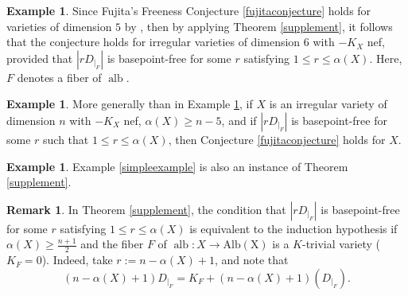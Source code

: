 \documentclass[sn-mathphys-num]{sn-jnl}%
\theoremstyle{definition}
\newtheorem{remark}[theorem]{Remark}
\newtheorem{example}[theorem]{Example}
\numberwithin{equation}{section}
\begin{document}
\begin{example}\label{6dimensionexample}
    Since Fujita's Freeness Conjecture \ref{fujitaconjecture} holds for varieties of dimension $5$ by \cite{feizhu}, then by applying Theorem \ref{supplement}, it follows that the conjecture holds for irregular varieties of dimension $6$ with $-K_{X}$ nef, provided that  $|rD_{|_{F}}|$ is basepoint-free for some $r$ satisfying  $1\leq r  \leq \alpha(X)$. Here, $F$ denotes a fiber of $\operatorname{alb}$.
\end{example}
\begin{example}
    More generally than in Example \ref{6dimensionexample}, if $X$ is an irregular variety of dimension $n$ with  $-K_{X}$ nef, $\alpha(X) \geq n-5$, and if $|rD_{|_{F}}|$ is basepoint-free for some $r$ such that  $1\leq r  \leq \alpha(X)$, then Conjecture \ref{fujitaconjecture} holds for $X$.
\end{example}
\begin{example}
Example \ref{simpleexample} is also an instance of Theorem \ref{supplement}. 
\end{example}
\begin{remark}
In Theorem \ref{supplement}, the condition that $|rD_{|_{F}}|$ is basepoint-free for some $r$ satisfying  $1\leq r  \leq \alpha(X)$ is equivalent  to the induction hypothesis if $\alpha(X) \geq \frac{n+1}{2}$ and the fiber $F$ of $\operatorname{alb}: X \to \operatorname{Alb(X)}$ is a $K$-trivial variety ($K_{F}=0$). Indeed, take $r := n- \alpha(X) +1$, and  note that $$(n -\alpha(X)+1)D_{|_{F}} = K_{F} + (n-\alpha(X)+1)(D_{|_{F}}) \text{.}$$
\end{remark}
\end{document}
